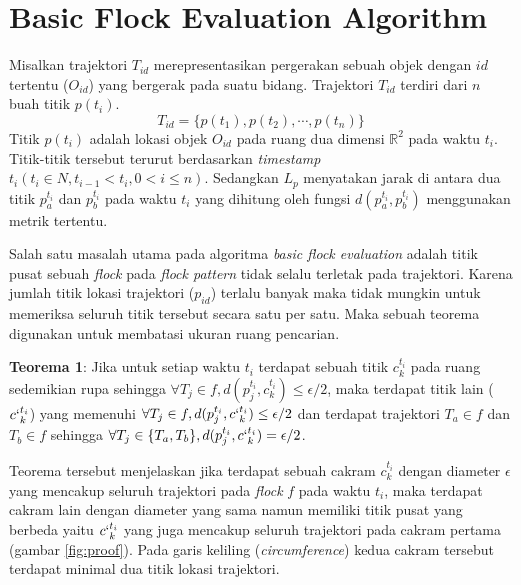 \section{Basic Flock Evaluation Algorithm}
\label{sec:bfe}

\par Misalkan trajektori $T_{id}$ merepresentasikan pergerakan sebuah objek dengan $id$ tertentu ($O_{id}$) yang bergerak pada suatu bidang. Trajektori $T_{id}$ terdiri dari $n$ buah titik $p(t_i)$.
\begin{equation}\label{definisi_trajektori}
	T_{id}=\{p(t_{1}),p(t_{2}),\cdots ,p(t_{n})\}
\end{equation}
Titik $p(t_i)$ adalah lokasi objek $O_{id}$ pada ruang dua dimensi $\mathbb{R}^2$ pada waktu $t_i$. Titik-titik tersebut terurut berdasarkan \textit{timestamp} $t_i (t_i\in N, t_{i-1} < t_i, 0 < i \leq n)$. Sedangkan $L_p$ menyatakan jarak di antara dua titik $p_a^{t_i}$ dan $p_b^{t_i}$ pada waktu $t_i$ yang dihitung oleh fungsi $d(p_a^{t_i},p_b^{t_i})$ menggunakan metrik tertentu.

\par Salah satu masalah utama pada algoritma \textit{basic flock evaluation} adalah titik pusat sebuah \textit{flock} pada \textit{flock pattern} tidak selalu terletak pada trajektori. Karena jumlah titik lokasi trajektori ($p_{id}$) terlalu banyak maka tidak mungkin untuk memeriksa seluruh titik tersebut secara satu per satu. Maka sebuah teorema digunakan untuk membatasi ukuran ruang pencarian. 

\par \textbf{Teorema 1}: Jika untuk setiap waktu $t_i$ terdapat sebuah titik $c_k^{t_i}$ pada ruang sedemikian rupa sehingga $\forall T_{j}\in f,d(p_j^{t_i},c_k^{t_i})\leq\epsilon/2 $, maka terdapat titik lain ($c`_k^{t_i}$) yang memenuhi $\forall T_{j}\in f,d(p_j^{t_i},c`_k^{t_i})\leq\epsilon/2 $ dan terdapat trajektori $T_{a}\in f$ dan $T_{b}\in f$ sehingga $\forall T_j\in\{T_a,T_b\},d(p_j^{t_i},c`_k^{t_i})=\epsilon/2 $.

\par Teorema tersebut menjelaskan jika terdapat sebuah cakram $c_k^{t_i}$ dengan diameter $\epsilon$ yang mencakup seluruh trajektori pada \textit{flock} $f$ pada waktu $t_i$, maka terdapat cakram lain dengan diameter yang sama namun memiliki titik pusat yang berbeda yaitu $c`_k^{t_i}$ yang juga mencakup seluruh trajektori pada cakram pertama (gambar \ref{fig:proof}). Pada garis keliling (\textit{circumference}) kedua cakram tersebut terdapat minimal dua titik lokasi trajektori.

